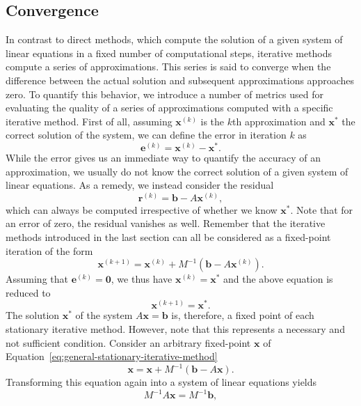 \subsection{Convergence}
In contrast to direct methods, which compute the solution of a given system of linear equations in a fixed number of computational steps, iterative methods compute a series of approximations.
This series is said to converge when the difference between the actual solution and subsequent approximations approaches zero.
To quantify this behavior, we introduce a number of metrics used for evaluating the quality of a series of approximations computed with a specific iterative method.
First of all, assuming $\bm{x}^{(k)}$ is the $k$th approximation and $\bm{x}^{*}$ the correct solution of the system, we can define the error in iteration $k$ as
\begin{equation}
	\bm{e}^{(k)} = \bm{x}^{(k)} - \bm{x}^{*}.
\end{equation}
While the error gives us an immediate way to quantify the accuracy of an approximation, we usually do not know the correct solution of a given system of linear equations.
As a remedy, we instead consider the residual
\begin{equation}
	\bm{r}^{(k)} = \bm{b} - A \bm{x}^{(k)},
\end{equation}
which can always be computed irrespective of whether we know $\bm{x}^{*}$.
Note that for an error of zero, the residual vanishes as well.
Remember that the iterative methods introduced in the last section can all be considered as a fixed-point iteration of the form
\begin{equation*}
	\bm{x}^{(k+1)} = \bm{x}^{(k)} + M^{-1}(\bm b - A \bm{x}^{(k)}).
\end{equation*}
Assuming that $\bm{e}^{(k)} = \bm{0}$, we thus have $\bm{x}^{(k)} = \bm{x}^{*}$ and the above equation is reduced to
\begin{equation*}
	\bm{x}^{(k+1)} = \bm{x}^{*}.
\end{equation*}
The solution $\bm{x}^{*}$ of the system $A \bm{x} = \bm{b}$ is, therefore, a fixed point of each stationary iterative method.
However, note that this represents a necessary and not sufficient condition. 
Consider an arbitrary fixed-point $\bm{x}$ of Equation~\eqref{eq:general-stationary-iterative-method}
\begin{equation}
	\bm{x} = \bm{x} + M^{-1}(\bm b - A \bm{x}).
\end{equation}
Transforming this equation again into a system of linear equations yields
\begin{equation*}
	M^{-1} A \bm{x} = M^{-1}\bm b,
\end{equation*}
